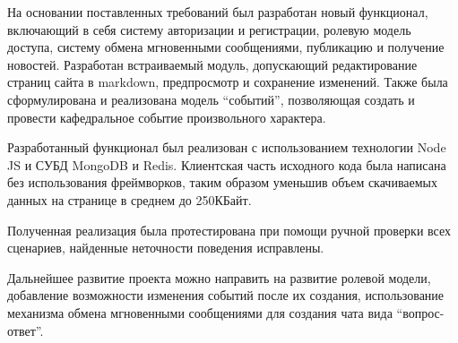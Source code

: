 \documentclass[14pt]{extarticle}
\begin{document}
На основании поставленных требований был разработан новый функционал, включающий в себя систему авторизации и регистрации, ролевую модель доступа, систему обмена мгновенными сообщениями, публикацию и получение новостей. Разработан встраиваемый модуль, допускающий редактирование страниц сайта в markdown, предпросмотр и сохранение изменений. Также была сформулирована и реализована модель \enquote{событий}, позволяющая создать и провести кафедральное событие произвольного характера.

Разработанный функционал был реализован с использованием технологии Node JS и СУБД MongoDB и Redis. Клиентская часть исходного кода была написана без использования фреймворков, таким образом уменьшив объем скачиваемых данных на странице в среднем до 250КБайт.

Полученная реализация была протестирована при помощи ручной проверки всех сценариев, найденные неточности поведения исправлены.

Дальнейшее развитие проекта можно направить на развитие ролевой модели, добавление возможности изменения событий после их создания, использование механизма обмена мгновенными сообщениями для создания чата вида \enquote{вопрос-ответ}.
\end{document}
